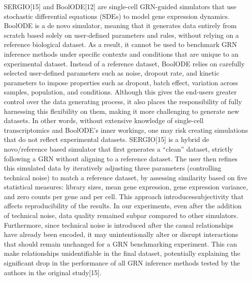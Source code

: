 SERGIO[15] and BoolODE[12] are single-cell GRN-guided simulators that use stochastic
differential equations (SDEs) to model gene expression dynamics. BoolODE is a de novo
simulator, meaning that it generates data entirely from scratch based solely on user-defined
parameters and rules, without relying on a reference biological dataset. As a result, it cannot be
used to benchmark GRN inference methods under specific contexts and conditions that are unique to an experimental dataset. Instead of a reference dataset, BoolODE relies on carefully
selected user-defined parameters such as noise, dropout rate, and kinetic parameters to impose
properties such as dropout, batch effect, variation across samples, population, and conditions.
Although this gives the end-users greater control over the data generating process, it also places
the responsibility of fully harnessing this flexibility on them, making it more challenging to
generate new datasets. In other words, without extensive knowledge of single-cell
transcriptomics and BoolODE’s inner workings, one may risk creating simulations that do not
reflect experimental datasets. SERGIO[15] is a hybrid de novo/reference based simulator that
first generates a “clean” dataset, strictly following a GRN without aligning to a reference dataset.
The user then refines this simulated data by iteratively adjusting three parameters (controlling
technical noise) to match a reference dataset, by assessing similarity based on five statistical
measures: library sizes, mean gene expression, gene expression variance, and zero counts per
gene and per cell. This approach introducessubjectivity that affects reproducibility of the results.
In our experiments, even after the addition of technical noise, data quality remained subpar
compared to other simulators. Furthermore, since technical noise is introduced after the causal
relationships have already been encoded, it may unintentionally alter or disrupt interactions that
should remain unchanged for a GRN benchmarking experiment. This can make relationships
unidentifiable in the final dataset, potentially explaining the significant drop in the performance
of all GRN inference methods tested by the authors in the original study[15].

